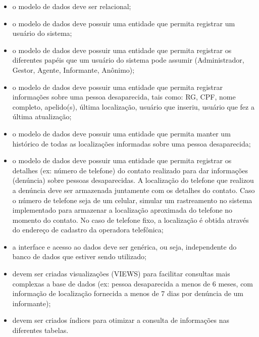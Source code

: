 \documentclass[12pt]{article}
\begin{document}
\begin{itemize}
\itemsep 5mm

\item o modelo de dados deve ser relacional;

\item o modelo de dados deve possuir uma entidade que permita registrar um usuário do sistema;

\item o modelo de dados deve possuir uma entidade que permita registrar os diferentes papéis que um usuário do sistema pode assumir (Administrador, Gestor, Agente, Informante, Anônimo);

\item o modelo de dados deve possuir uma entidade que permita registrar informações sobre uma pessoa desaparecida, tais como:  RG, CPF, nome completo, apelido(s), última localização, usuário que inseriu, usuário que fez a última atualização;

\item o modelo de dados deve possuir uma entidade que permita manter um histórico de todas as localizações informadas sobre uma pessoa desaparecida;

\item o modelo de dados deve possuir uma entidade que permita registrar os detalhes (ex: número de telefone) do contato realizado para dar informações (denúncia) sobre pessoas desaparecidas. A localização do telefone que realizou a denúncia deve ser armazenada juntamente com os detalhes do contato. Caso o número de telefone seja de um celular, simular um rastreamento no sistema implementado para armazenar a localização aproximada do telefone no momento do contato. No caso de telefone fixo, a localização é obtida através do endereço de cadastro da operadora telefônica;

\item a interface e acesso ao dados deve ser genérica, ou seja, independente do banco de dados que estiver sendo utilizado;

\item devem ser criadas visualizações (VIEWS) para facilitar consultas mais complexas a base de dados (ex: pessoa desaparecida a menos de 6 meses, com informação de localização fornecida a menos de 7 dias por denúncia de um informante);

\item devem ser criados índices para otimizar a consulta de informações nas diferentes tabelas.

\end{itemize}
\end{document}
